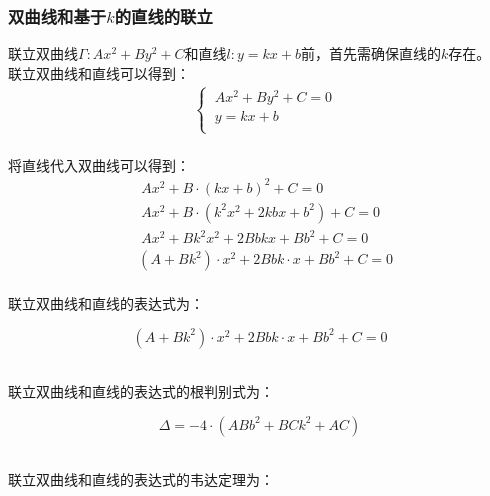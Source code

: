 \documentclass[UTF8]{ctexart}
\begin{document}
\subsubsection{双曲线和基于$k$的直线的联立}
    \setcounter{equation}{0}
    联立双曲线$\Gamma:Ax^2+By^2+C$和直线$l:y=kx+b$前，首先需确保直线的$k$存在。\\[3mm]
    联立双曲线和直线可以得到：
    \begin{align}
        &\begin{cases}
            ~Ax^2+By^2+C=0\\[1mm]
            ~y=kx+b\\[1mm]
        \end{cases}
    \end{align}\\[1mm]
    将直线代入双曲线可以得到：
    \begin{align}
        &~Ax^2+B\cdot(kx+b)^2+C=0\\[5mm]
        &~Ax^2+B\cdot\left(k^2x^2+2kbx+b^2\right)+C=0\\[5mm]
        &~Ax^2+Bk^2x^2+2Bbkx+Bb^2+C=0\\[5mm]
        &\left(A+Bk^2\right)\cdot x^2+2Bbk\cdot x+Bb^2+C=0
    \end{align}\\
    联立双曲线和直线的表达式为：
    \begin{large}
        \begin{equation*}
            \left(A+Bk^2\right)\cdot x^2+2Bbk\cdot x+Bb^2+C=0
        \end{equation*}
    \end{large}\\
    联立双曲线和直线的表达式的根判别式为：
    \begin{large}
        \begin{equation*}
            \Delta=-4\cdot\left(ABb^2+BCk^2+AC\right)
        \end{equation*}
    \end{large}\\
    联立双曲线和直线的表达式的韦达定理为：\vspace{8pt}
\end{document}
